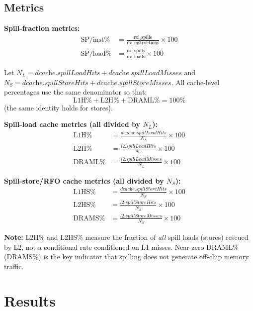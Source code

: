 \documentclass[conference]{IEEEtran}
\begin{document}
\subsection{Metrics}

\textbf{Spill-fraction metrics:}
\begin{align*}
\text{SP/inst\%} &= \frac{\text{roi\_spills}}{\text{roi\_instructions}} \times 100 \\[2pt]
\text{SP/load\%} &= \frac{\text{roi\_spills}}{\text{roi\_loads}} \times 100
\end{align*}

Let $N_L = \textit{dcache.spillLoadHits}+\textit{dcache.spillLoadMisses}$ and
$N_S = \textit{dcache.spillStoreHits}+\textit{dcache.spillStoreMisses}$.
All cache-level percentages use the same denominator so that:
\[
  \text{L1H\%} + \text{L2H\%} + \text{DRAML\%} = 100\%
\]
(the same identity holds for stores).

\textbf{Spill-load cache metrics (all divided by $N_L$):}
\begin{align*}
\text{L1H\%}   &= \frac{\textit{dcache.spillLoadHits}}{N_L} \times 100 \\[2pt]
\text{L2H\%}   &= \frac{\textit{l2.spillLoadHits}}{N_L} \times 100 \\[2pt]
\text{DRAML\%} &= \frac{\textit{l2.spillLoadMisses}}{N_L} \times 100
\end{align*}

\textbf{Spill-store/RFO cache metrics (all divided by $N_S$):}
\begin{align*}
\text{L1HS\%}  &= \frac{\textit{dcache.spillStoreHits}}{N_S} \times 100 \\[2pt]
\text{L2HS\%}  &= \frac{\textit{l2.spillStoreHits}}{N_S} \times 100 \\[2pt]
\text{DRAMS\%} &= \frac{\textit{l2.spillStoreMisses}}{N_S} \times 100
\end{align*}

\noindent
\textbf{Note:} L2H\% and L2HS\% measure the fraction of \emph{all} spill
loads (stores) rescued by L2, not a conditional rate conditioned on L1 misses.
Near-zero DRAML\% (DRAMS\%) is the key indicator that spilling does not
generate off-chip memory traffic.

\section{Results}
\end{document}
